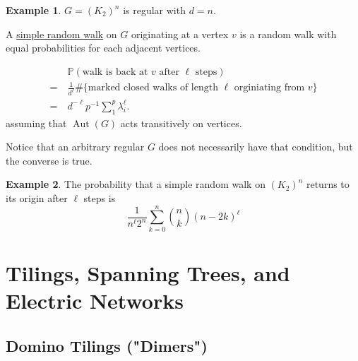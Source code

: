 \documentclass{report}
\newcommand{\matP}{\mathbb{P}}
\def \Aut {\operatorname{Aut}}
\theoremstyle{definition}
\newtheorem{example}{Example}[section]
\theoremstyle{remark}
\numberwithin{equation}{section}
\begin{document}
\begin{example}
$G = (K_2)^n$ is regular with $d = n.$
\end{example}

A \underline{simple random walk} on $G$ originating at a vertex $v$ is a random walk with equal probabilities for each adjacent vertices.

\begin{align*}
    & \matP\left(\text{walk is back at $v$ after $\ell$ steps}\right) \\
    =\ & \frac{1}{d^\ell} \#\{\text{marked closed walks of length $\ell$ orginiating from $v$}\} \\
    =\ & d^{-\ell} p^{-1} \sum_1^p \lambda_i^\ell.
\end{align*}
assuming that $\Aut(G)$ acts transitively on vertices.

Notice that an arbitrary regular $G$ does not necessarily have that condition, but the converse is true.

\begin{example}
The probability that a simple random walk on $(K_2)^n$ returns to its origin after $\ell $ steps is
\[
\frac{1}{n^\ell 2^n} \sum_{k = 0}^n \binom{n}{k} (n - 2k)^\ell
\]
\end{example}


\chapter{Tilings, Spanning Trees, and Electric Networks}
\section{Domino Tilings ("Dimers")}
\end{document}
